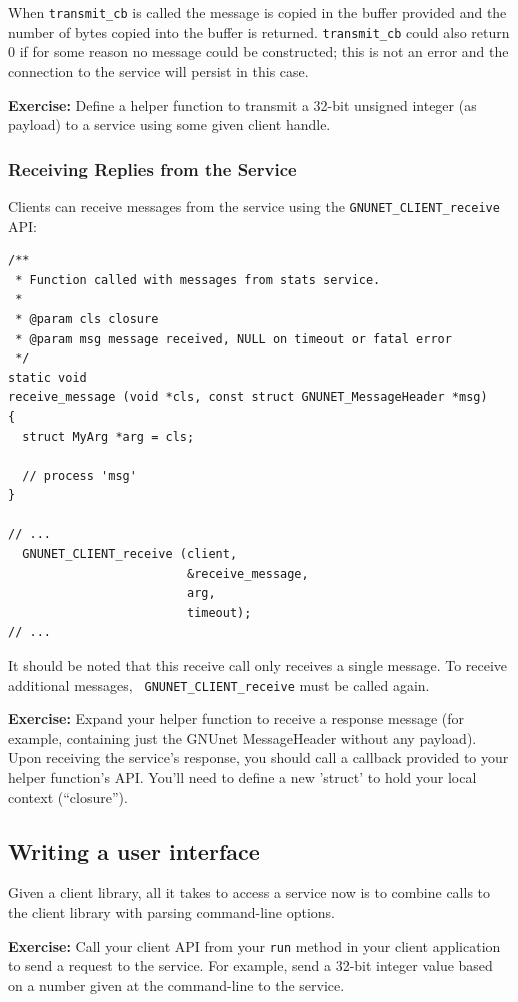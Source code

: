 \documentclass[10pt]{article}
\newcommand{\exercise}[1]{\noindent\begin{boxedminipage}{\textwidth}{\bf Exercise:} #1 \end{boxedminipage}}
\begin{document}
When {\tt transmit\_cb} is called the message is copied in the buffer provided and
the number of bytes copied into the buffer is returned. {\tt transmit\_cb}
could also return 0 if for some reason no message
could be constructed; this is not an error and the connection to the
service will persist in this case.

\exercise{Define a helper function to transmit a 32-bit
unsigned integer (as payload) to a service using some given client
handle.}


\subsubsection{Receiving Replies from the Service}

Clients can receive messages from the service using the
{\tt GNUNET\_CLIENT\_receive} API:

\lstset{language=c}
\begin{lstlisting}
/**
 * Function called with messages from stats service.
 *
 * @param cls closure
 * @param msg message received, NULL on timeout or fatal error
 */
static void
receive_message (void *cls, const struct GNUNET_MessageHeader *msg)
{
  struct MyArg *arg = cls;

  // process 'msg'
}

// ...
  GNUNET_CLIENT_receive (client,
                         &receive_message,
                         arg,
                         timeout);
// ...
\end{lstlisting}

It should be noted that this receive call only receives a single
message.  To receive additional messages, {\tt
  GNUNET\_CLIENT\_receive} must be called again.

\exercise{Expand your helper function to receive a
response message (for example, containing just the GNUnet MessageHeader
without any payload).  Upon receiving the service's response, you should
call a callback provided to your helper function's API.  You'll need to
define a new 'struct' to hold your local context (``closure'').}


\subsection{Writing a user interface}

Given a client library, all it takes to access a service now is to
combine calls to the client library with parsing command-line
options.

\exercise{Call your client API from your {\tt run} method
in your client application to send a request to the service.
For example, send a 32-bit integer value based on a number given
at the command-line to the service.}
\end{document}
